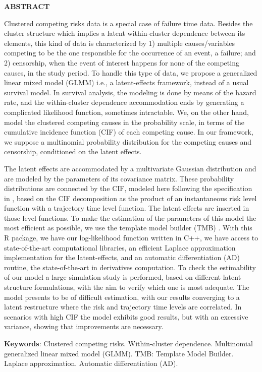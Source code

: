 \documentclass[12pt, %
               openright, %
               oneside, %
               a4paper, %
               chapter=TITLE, %
               section=TITLE, %
               brazil,
               english %
]{abntex2}
\begin{document}
\begin{resumo}[]
  \vspace{-2cm}
  \begin{center}
    \bfseries{\large{\textsf{ABSTRACT}}}
  \end{center}
  \vspace{0.3cm}

  Clustered competing risks data is a special case of failure time
  data. Besides the cluster structure which implies a latent
  within-cluster dependence between its elements, this kind of data is
  characterized by 1) multiple causes/variables competing to be the one
  responsible for the occurrence of an event, a failure; and 2)
  censorship, when the event of interest happens for none of the
  competing causes, in the study period. To handle this type of data, we
  propose a generalized linear mixed model (GLMM) i.e., a latent-effects
  framework, instead of a usual survival model. In survival analysis,
  the modeling is done by means of the hazard rate, and the
  within-cluster dependence accommodation ends by generating a
  complicated likelihood function, sometimes intractable. We, on the
  other hand, model the clustered competing causes in the probability
  scale, in terms of the cumulative incidence function (CIF) of each
  competing cause. In our framework, we suppose a multinomial
  probability distribution for the competing causes and censorship,
  conditioned on the latent effects.

  The latent effects are accommodated by a multivariate Gaussian
  distribution and are modeled by the parameters of its covariance
  matrix. These probability distributions are connected by the CIF,
  modeled here following the specification in ,
  based on the CIF decomposition as the product of an instantaneous risk
  level function with a trajectory time level function. The latent
  effects are inserted in those level functions.  To make the estimation
  of the parameters of this model the most efficient as possible, we use
  the template model builder (TMB) \cite{TMB}. With this R \cite{R21}
  package, we have our log-likelihood function written in C++, we have
  access to state-of-the-art computational libraries, an efficient
  Laplace approximation implementation for the latent-effects, and an
  automatic differentiation (AD) routine, the state-of-the-art in
  derivatives computation. To check the estimability of our model a
  large simulation study is performed, based on different latent
  structure formulations, with the aim to verify which one is most
  adequate. The model presents to be of difficult estimation, with our
  results converging to a latent restructure where the risk and
  trajectory time levels are correlated. In scenarios with high CIF the
  model exhibits good results, but with an excessive variance, showing
  that improvements are necessary.
    
  \textbf{Keywords}: Clustered competing risks.
                     Within-cluster dependence.
                     Multinomial generalized linear mixed model (GLMM).
                     TMB: Template Model Builder.
                     Laplace approximation.
                     Automatic differentiation (AD).
\end{resumo}
\end{document}

